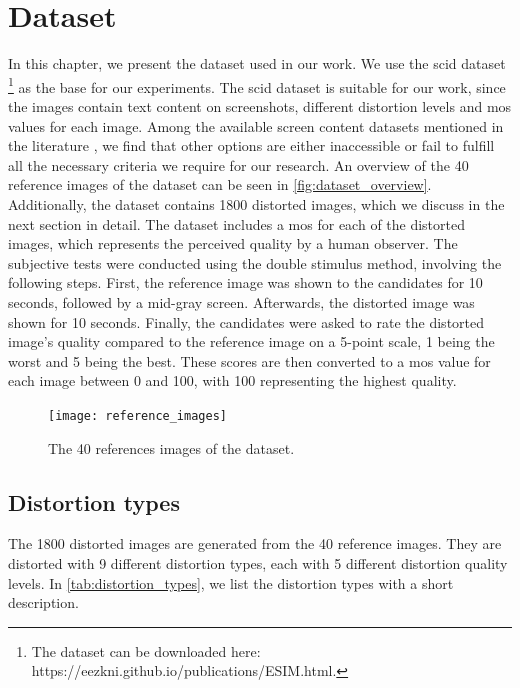\chapter{Dataset}
\label{chap:dataset}
In this chapter, we present the dataset used in our work.
We use the \gls{scid} dataset \cite{ni_esim_2017}\footnote{The dataset can be downloaded here: https://eezkni.github.io/publications/ESIM.html.} as the base for our experiments.
The \gls{scid} dataset is suitable for our work, since the images contain text content on screenshots, different distortion levels and \gls{mos} values for each image.
Among the available screen content datasets mentioned in the literature \cite{iqa_survey_2020}, we find that other options are either inaccessible or fail to fulfill all the necessary criteria we require for our research.
An overview of the 40 reference images of the dataset can be seen in \autoref{fig:dataset_overview}.
Additionally, the dataset contains 1800 distorted images, which we discuss in the next section in detail.
The dataset includes a \gls{mos} for each of the distorted images, which represents the perceived quality by a human observer.
The subjective tests were conducted using the double stimulus method, involving the following steps.
First, the reference image was shown to the candidates for 10 seconds, followed by a mid-gray screen.
Afterwards, the distorted image was shown for 10 seconds.
Finally, the candidates were asked to rate the distorted image's quality compared to the reference image on a 5-point scale, 1 being the worst and 5 being the best.
These scores are then converted to a \gls{mos} value for each image between 0 and 100, with 100 representing the highest quality.



\begin{figure}
    \centering
    \texttt{[image: reference\_images]}
    \caption{The 40 references images of the dataset.}
    \label{fig:dataset_overview}
\end{figure}


\section{Distortion types}
\label{sec:dataset_distortion_types}


The 1800 distorted images are generated from the 40 reference images.
They are distorted with 9 different distortion types, each with 5 different distortion quality levels.
In \autoref{tab:distortion_types}, we list the distortion types with a short description.


